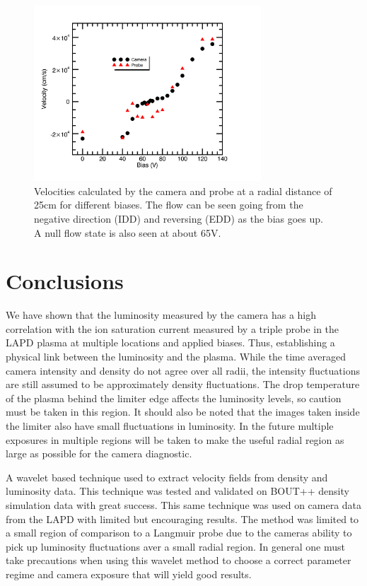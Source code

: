 \documentclass{jpp}
\begin{document}
\begin{figure}
\centerline{\includegraphics[width=8.5cm]{plot_Velocity_at_25cm_camAt23cm_biasScan}}
\caption{ Velocities calculated by the camera and probe at a radial distance of 25cm for different biases.  The flow can be seen going from the negative direction (IDD) and reversing (EDD) as the bias goes up.  A null flow state is also seen at about 65V.}
\label{fig:plot_Velocity_at_25cm_camAt23cm_biasScan}
\end{figure}


\section{Conclusions}

We have shown that the luminosity measured by the camera has a high correlation with the ion saturation current measured by a triple probe in the LAPD plasma at multiple locations and applied biases. Thus, establishing a physical link between the luminosity and the plasma. While the time averaged camera intensity and density do not agree over all radii, the intensity fluctuations are still assumed to be approximately density fluctuations.  The drop temperature of the plasma behind the limiter edge affects the luminosity levels, so caution must be taken in this region.  It should also be noted that the images taken inside the limiter also have small fluctuations in luminosity.  In the future multiple exposures in multiple regions will be taken to make the useful radial region as large as possible for the camera diagnostic.  

A wavelet based technique used to extract velocity fields from density and luminosity data.  This technique was tested and validated on BOUT++ density simulation data with great success.  This same technique was used on camera data from the LAPD with limited but encouraging results.  The method was limited to a small region of comparison to a Langmuir probe due to the cameras ability to pick up luminosity fluctuations aver a small radial region.  In general one must take precautions when using this wavelet method to choose a correct parameter regime and camera exposure that will yield good results. 
\end{document}
